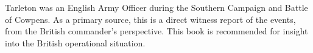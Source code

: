 Tarleton was an English Army Officer during the Southern Campaign and Battle
of Cowpens. As a primary source, this is a direct witness report of the events,
from the British commander's perspective. This book is recommended for insight
into the British operational situation.
